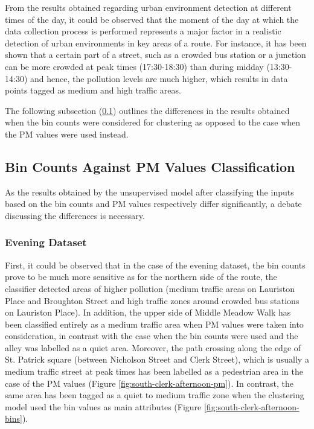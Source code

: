 \documentclass[bsc,frontabs,twoside,singlespacing, parskip,deptreport]{infthesis}     %
\begin{document}
From the results obtained regarding urban environment detection at different times of the day, it could be observed that the moment of the day at which the data collection process is performed represents a major factor in a realistic detection of urban environments in key areas of a route. For instance, it has been shown that a certain part of a street, such as a crowded bus station or a junction can be more crowded at peak times (17:30-18:30) than during midday (13:30-14:30) and hence, the pollution levels are much higher, which results in data points tagged as medium and high traffic areas.

The following subsection (\ref{subsec:bin-counts-pm-vals}) outlines the differences in the results obtained when the bin counts were considered for clustering as opposed to the case when the PM values were used instead.

\subsection{Bin Counts Against PM Values Classification}
\label{subsec:bin-counts-pm-vals}

As the results obtained by the unsupervised model after classifying the inputs based on the bin counts and PM values respectively differ significantly, a debate discussing the differences is necessary. 

\subsubsection*{Evening Dataset}

First, it could be observed that in the case of the evening dataset, the bin counts prove to be much more sensitive as for the northern side of the route, the classifier detected areas of higher pollution (medium traffic areas on Lauriston Place and Broughton Street and high traffic zones around crowded bus stations on Lauriston Place).  In addition, the upper side of Middle Meadow Walk has been classified entirely as a medium traffic area when PM values were taken into consideration, in contrast with the case when the bin counts were used and the alley was labelled as a quiet area. Moreover, the path crossing along the edge of St. Patrick square (between Nicholson Street and Clerk Street), which is usually a medium traffic street at peak times has been labelled as a pedestrian area in the case of the PM values (Figure \ref{fig:south-clerk-afternoon-pm}). In contrast, the same area has been tagged as a quiet to medium traffic zone when the clustering model used the bin values as main attributes (Figure \ref{fig:south-clerk-afternoon-bins}).
\end{document}
